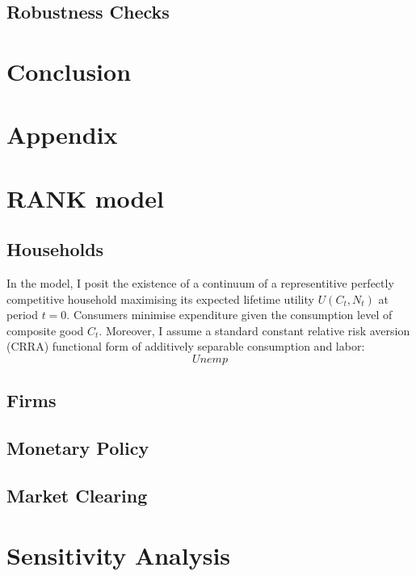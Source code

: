 \documentclass[11pt, a4paper, leqno]{article}
\begin{document}
\subsection{Robustness Checks}


\section{Conclusion}

\clearpage


\clearpage

\section*{\Huge Appendix}
\appendix
\setcounter{equation}{0}
\section{RANK model}
\subsection{Households}
In the model, I posit the existence of a continuum of a representitive perfectly competitive household maximising its expected lifetime utility $U \left( C_{t},N_{t} \right)$ at period $t = 0$. Consumers minimise expenditure given the consumption level of composite good $C_{t}$. Moreover, I assume a standard constant relative risk aversion (CRRA) functional form of additively separable consumption and labor:
\begin{equation}
    Unemp
\end{equation}

\subsection{Firms}

\subsection{Monetary Policy}

\subsection{Market Clearing}

\section{Sensitivity Analysis}
\end{document}
